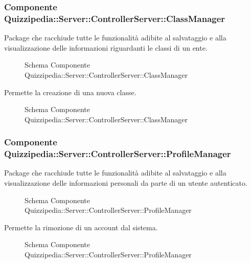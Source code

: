 \subsubsection{Componente Quizzipedia::Server::ControllerServer::ClassManager}
Package che racchiude tutte le funzionalità adibite al salvataggio e alla visualizzazione delle informazioni riguardanti le classi di un ente.
\begin{figure}[H]
\centering
\noindent{}
\caption{Schema Componente Quizzipedia::Server::ControllerServer::ClassManager}
\end{figure}
Permette la creazione di una nuova classe.
\begin{figure}[H]
\centering
\noindent{}
\caption{Schema Componente Quizzipedia::Server::ControllerServer::ClassManager}
\end{figure}
\subsubsection{Componente Quizzipedia::Server::ControllerServer::ProfileManager}
Package che racchiude tutte le funzionalità adibite al salvataggio e alla visualizzazione delle informazioni personali da parte di un utente autenticato.
\begin{figure}[H]
\centering
\noindent{}
\caption{Schema Componente Quizzipedia::Server::ControllerServer::ProfileManager}
\end{figure}
Permette la rimozione di un account dal sistema.
\begin{figure}[H]
\centering
\noindent{}
\caption{Schema Componente Quizzipedia::Server::ControllerServer::ProfileManager}
\end{figure}
